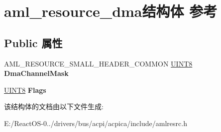 \hypertarget{structaml__resource__dma}{}\section{aml\+\_\+resource\+\_\+dma结构体 参考}
\label{structaml__resource__dma}
\subsection*{Public 属性}
\begin{DoxyCompactItemize}
\item 
\mbox{\label{structaml__resource__dma_a990b1172a3845c17e6412fa8d59bfdc8}} 
A\+M\+L\+\_\+\+R\+E\+S\+O\+U\+R\+C\+E\+\_\+\+S\+M\+A\+L\+L\+\_\+\+H\+E\+A\+D\+E\+R\+\_\+\+C\+O\+M\+M\+ON \hyperlink{_processor_bind_8h_ab27e9918b538ce9d8ca692479b375b6a}{U\+I\+N\+T8} {\bfseries Dma\+Channel\+Mask}
\item 
\mbox{\label{structaml__resource__dma_ad924671921fe3dc8d1a450aa338a101e}} 
\hyperlink{_processor_bind_8h_ab27e9918b538ce9d8ca692479b375b6a}{U\+I\+N\+T8} {\bfseries Flags}
\end{DoxyCompactItemize}


该结构体的文档由以下文件生成\+:\begin{DoxyCompactItemize}
\item 
E\+:/\+React\+O\+S-\/0../drivers/bus/acpi/acpica/include/amlresrc.\+h\end{DoxyCompactItemize}
